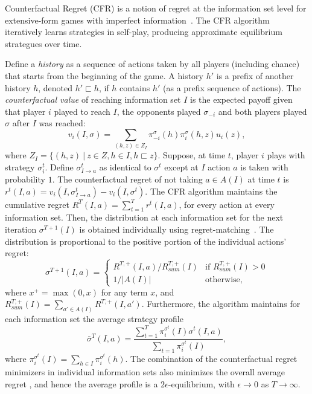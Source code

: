 Counterfactual Regret (CFR) is a notion of regret at the information set level for extensive-form games with imperfect information~\cite{CFR}.
The CFR algorithm iteratively learns strategies in self-play, producing approximate equilibrium strategues over time. 

Define a {\it history} as a sequence of actions taken by all players (including chance) that starts from the beginning of the game. 
A history $h'$ is a prefix of another history $h$, denoted $h' \sqsubset h$, if $h$ contains $h'$ (as a prefix sequence of actions).  
The {\it counterfactual value} of reaching information set $I$ is the expected payoff given that player $i$ played to reach $I$, the opponents played
$\sigma_{-i}$ and both players played $\sigma$ after $I$ was reached:
\begin{equation}
\label{eq:cfv}
v_i(I,\sigma) = \sum_{(h,z) \in Z_I} \pi^{\sigma}_{-i}(h) \pi^{\sigma}_{i}(h,z) u_i(z), 
\end{equation}
where $Z_I = \{ (h,z)~|~z \in Z, h \in I, h \sqsubset z \}$.
Suppose, at time $t$, player $i$ plays with strategy $\sigma^t_i$.
Define $\sigma^t_{I \rightarrow a}$ as identical to $\sigma^t$ except at $I$ action $a$ is taken with probability $1$.
The counterfactual regret of not taking $a \in A(I)$ at time $t$ is $r^t(I,a) = v_i(I,\sigma^t_{I \rightarrow a}) - v_i(I,\sigma^t)$.
The CFR algorithm maintains the cumulative regret $R^T(I,a) = \sum_{t=1}^T r^t(I,a)$, for every action at every information set.
Then, the distribution at each information set for the next iteration $\sigma^{T+1}(I)$ is obtained individually using
regret-matching~\cite{Hart00}. The distribution is proportional to the positive portion of the individual actions' regret:
\begin{equation*}
\label{eq:rm}
\sigma^{T+1}(I,a) = \left\{
\begin{array}{ll}
R^{T,+}(I,a) / R^{T,+}_{sum}(I) & \mbox{if } R^{T,+}_{sum}(I) > 0 \\ 
1 / |A(I)|                   & \mbox{otherwise,}
\end{array} \right.
\end{equation*}
where $x^+ = \max(0,x)$ for any term $x$, and $R^{T,+}_{sum}(I) = \sum_{a' \in A(I)} R^{T,+}(I,a')$. 
Furthermore, the algorithm maintains for each information set the average   strategy profile
\begin{equation}
\bar{\sigma}^T(I,a) = \frac{\sum_{t=1}^T \pi^{\sigma^t}_i(I) \sigma^t(I,a)}{\sum_{t=1} \pi^{\sigma^t}_i(I)}, 
\end{equation}
where $\pi^{\sigma^t}_i(I) = \sum_{h \in I}\pi^{\sigma^t}_i(h)$.
The combination of the counterfactual regret minimizers in individual information sets also minimizes the overall 
average regret \cite{CFR}, and hence the average profile is a  $2\epsilon$-equilibrium, with $\epsilon \rightarrow 0$
as $T \rightarrow \infty$.

